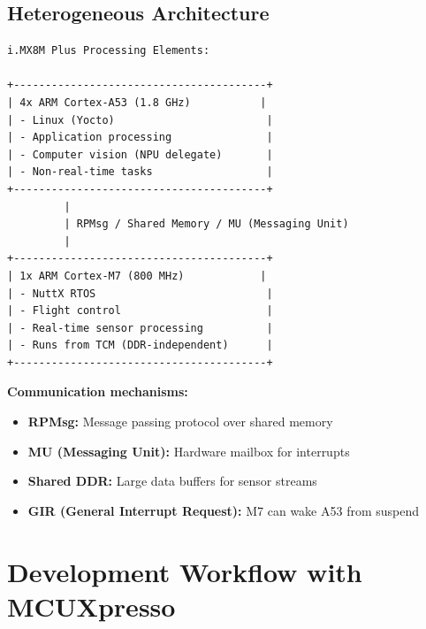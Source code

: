 \documentclass[12pt,a4paper]{report}
\begin{document}
\subsection{Heterogeneous Architecture}

\begin{verbatim}
i.MX8M Plus Processing Elements:

+----------------------------------------+
| 4x ARM Cortex-A53 (1.8 GHz)           |
| - Linux (Yocto)                        |
| - Application processing               |
| - Computer vision (NPU delegate)       |
| - Non-real-time tasks                  |
+----------------------------------------+
         |
         | RPMsg / Shared Memory / MU (Messaging Unit)
         |
+----------------------------------------+
| 1x ARM Cortex-M7 (800 MHz)            |
| - NuttX RTOS                           |
| - Flight control                       |
| - Real-time sensor processing          |
| - Runs from TCM (DDR-independent)      |
+----------------------------------------+
\end{verbatim}

\textbf{Communication mechanisms:}
\begin{itemize}
    \item \textbf{RPMsg:} Message passing protocol over shared memory
    \item \textbf{MU (Messaging Unit):} Hardware mailbox for interrupts
    \item \textbf{Shared DDR:} Large data buffers for sensor streams
    \item \textbf{GIR (General Interrupt Request):} M7 can wake A53 from suspend
\end{itemize}

\section{Development Workflow with MCUXpresso}
\end{document}

